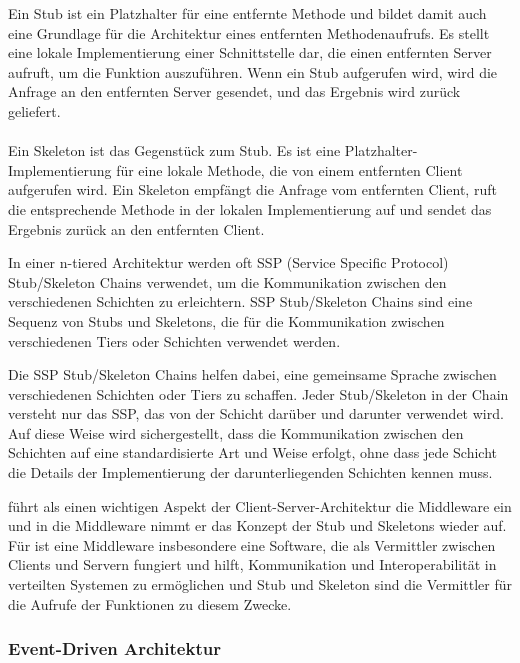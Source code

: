 \documentclass[../vs-script-first-v01.tex]{subfiles}
\begin{document}
\begin{itemize}
Ein Stub ist ein Platzhalter für eine entfernte Methode und bildet damit auch eine Grundlage für die Architektur eines entfernten Methodenaufrufs. Es stellt eine lokale Implementierung einer Schnittstelle dar, die einen entfernten Server aufruft, um die Funktion auszuführen. Wenn ein Stub aufgerufen wird, wird die Anfrage an den entfernten Server gesendet, und das Ergebnis wird zurück geliefert.
\\\\
Ein Skeleton ist das Gegenstück zum Stub. Es ist eine Platzhalter-Implementierung für eine lokale Methode, die von einem entfernten Client aufgerufen wird. Ein Skeleton empfängt die Anfrage vom entfernten Client, ruft die entsprechende Methode in der lokalen Implementierung auf und sendet das Ergebnis zurück an den entfernten Client.

In einer n-tiered Architektur werden oft SSP (Service Specific Protocol) Stub/Skeleton Chains verwendet, um die Kommunikation zwischen den verschiedenen Schichten zu erleichtern. SSP Stub/Skeleton Chains sind eine Sequenz von Stubs und Skeletons, die für die Kommunikation zwischen verschiedenen Tiers oder Schichten verwendet werden.

Die SSP Stub/Skeleton Chains helfen dabei, eine gemeinsame Sprache zwischen verschiedenen Schichten oder Tiers zu schaffen. Jeder Stub/Skeleton in der Chain versteht nur das SSP, das von der Schicht darüber und darunter verwendet wird. Auf diese Weise wird sichergestellt, dass die Kommunikation zwischen den Schichten auf eine standardisierte Art und Weise erfolgt, ohne dass jede Schicht die Details der Implementierung der darunterliegenden Schichten kennen muss.
\end{itemize}

\cite{tanenbaum2017distributed} führt als einen wichtigen Aspekt der Client-Server-Architektur die Middleware ein und in die Middleware nimmt er das Konzept der Stub und Skeletons wieder auf. Für \cite{tanenbaum2017distributed} ist eine Middleware insbesondere eine Software, die als Vermittler zwischen Clients und Servern fungiert und hilft, Kommunikation und Interoperabilität in verteilten Systemen zu ermöglichen und Stub und Skeleton sind die Vermittler für die Aufrufe der Funktionen zu diesem Zwecke.
              
\subsubsection{Event-Driven Architektur}
\end{document}

